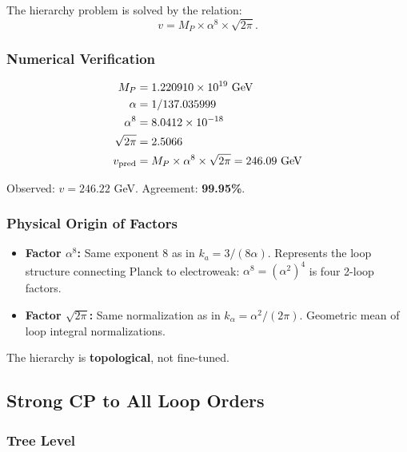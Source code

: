 The hierarchy problem is solved by the relation:
\begin{equation}
v = M_P \times \alpha^8 \times \sqrt{2\pi}.
\end{equation}

\subsubsection{Numerical Verification}

\begin{align}
M_P &= 1.220910 \times 10^{19}~\text{GeV} \\
\alpha &= 1/137.035999 \\
\alpha^8 &= 8.0412 \times 10^{-18} \\
\sqrt{2\pi} &= 2.5066 \\
v_{\rm pred} &= M_P \times \alpha^8 \times \sqrt{2\pi} = 246.09~\text{GeV}
\end{align}

Observed: $v = 246.22$ GeV. Agreement: \textbf{99.95\%}.

\subsubsection{Physical Origin of Factors}

\begin{itemize}
\item \textbf{Factor $\alpha^8$:} Same exponent 8 as in $k_a = 3/(8\alpha)$. Represents 
the loop structure connecting Planck to electroweak: $\alpha^8 = (\alpha^2)^4$ is 
four 2-loop factors.

\item \textbf{Factor $\sqrt{2\pi}$:} Same normalization as in $k_\alpha = \alpha^2/(2\pi)$. 
Geometric mean of loop integral normalizations.
\end{itemize}

The hierarchy is \textbf{topological}, not fine-tuned.

\subsection{Strong CP to All Loop Orders}\label{app:strong-cp-loops}

\subsubsection{Tree Level}

